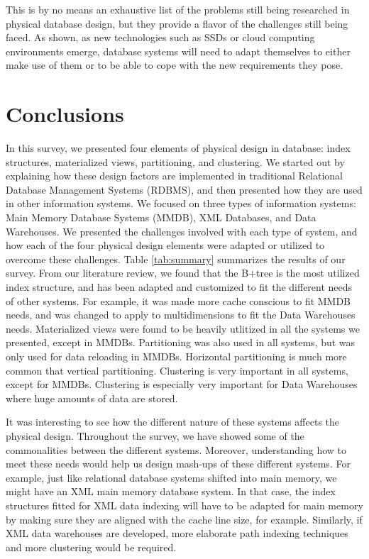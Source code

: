 \documentclass[12pt,a4paper]{article}
\begin{document}
This is by no means an exhaustive list of the problems still being researched in physical database design, but they provide a flavor of the challenges still
being faced. As shown, as new technologies such as SSDs or cloud computing environments emerge, database systems will need to adapt themselves to either make
use of them or to be able to cope with the new requirements they pose.

\section{Conclusions}
\label{SEC-CONCL}

In this survey, we presented four elements of physical design in database: index structures, materialized views, partitioning, and clustering. We started out
by explaining how these design factors are implemented in traditional Relational Database Management Systems (RDBMS), and then presented how they are used in
other information systems. We focused on three types of information systems: Main Memory Database Systems (MMDB), XML Databases, and Data Warehouses. We
presented the challenges involved with each type of system, and how each of the four physical design elements were adapted or utilized to overcome these
challenges. Table \ref{tab:summary} summarizes the results of our survey. From our literature review, we found that the B+tree is the most utilized index
structure, and has been adapted and customized to fit the different needs of other systems. For example, it was made more cache conscious to fit MMDB needs,
and was changed to apply to multidimensions to fit the Data Warehouses needs. Materialized views were found to be heavily utlitized in all the systems we
presented, except in MMDBs. Partitioning was also used in all systems, but was only used for data reloading in MMDBs. Horizontal partitioning is much more
common that vertical partitioning. Clustering is very important in all systems, except for MMDBs. Clustering is especially very important for Data Warehouses
where huge amounts of data are stored.

It was interesting to see how the different nature of these systems affects the physical design. Throughout the survey, we have showed some of the
commonalities between the different systems. Moreover, understanding how to meet these needs would help us design mash-ups of these different systems. For
example, just like relational database systems shifted into main memory, we might have an XML main memory database system. In that case, the index structures
fitted for XML data indexing will have to be adapted for main memory by making sure they are aligned with the cache line size, for example. Similarly, if XML
data warehouses are developed, more elaborate path indexing techniques and more clustering would be required. 
\end{document}
